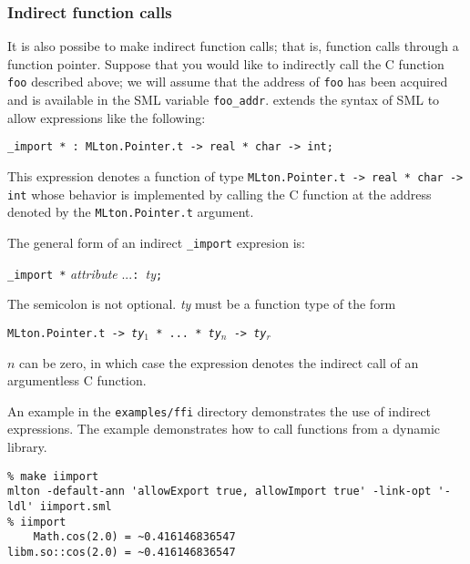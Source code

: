 \subsubsection{Indirect function calls}

It is also possibe to make indirect function calls; that is, function
calls through a function pointer.  Suppose that you would like to
indirectly call the C function {\tt foo} described above; we will
assume that the address of {\tt foo} has been acquired and is
available in the SML variable {\tt foo\_addr}.  {\mlton} extends the
syntax of SML to allow expressions like the following:
\begin{verbatim}
_import * : MLton.Pointer.t -> real * char -> int;
\end{verbatim}
This expression denotes a function of type {\tt MLton.Pointer.t -> real
* char -> int} whose behavior is implemented by calling the C function
at the address denoted by the {\tt MLton.Pointer.t} argument.

The general form of an indirect \verb+_import+ expresion is:
\begin{center}
{\tt \_import *} {\it attribute} ...{\tt : }{\it ty}{\tt ;}
\end{center}
The semicolon is not optional. {\it ty} must be a function type of the form
\begin{center}
{\tt MLton.Pointer.t -> {\it ty}$_1$ * ... * {\it ty}$_n$ -> {\it ty}$_r$}
\end{center}
$n$ can be zero, in which case the expression denotes the indirect
call of an argumentless C function.

An example in the {\tt examples/ffi} directory demonstrates the use of
indirect {} expressions.  The example demonstrates how to call
functions from a dynamic library.

\begin{verbatim}
% make iimport
mlton -default-ann 'allowExport true, allowImport true' -link-opt '-ldl' iimport.sml
% iimport
    Math.cos(2.0) = ~0.416146836547
libm.so::cos(2.0) = ~0.416146836547
\end{verbatim}

